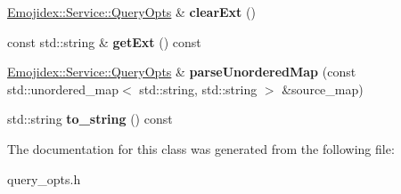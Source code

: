 \begin{DoxyCompactItemize}
\item 
\hyperlink{classEmojidex_1_1Service_1_1QueryOpts}{Emojidex\+::\+Service\+::\+Query\+Opts} \& {\bfseries clear\+Ext} ()\hypertarget{classEmojidex_1_1Service_1_1QueryOpts_ae0455c295169a616efbbd5b3721c998f}{}\label{classEmojidex_1_1Service_1_1QueryOpts_ae0455c295169a616efbbd5b3721c998f}

\item 
const std\+::string \& {\bfseries get\+Ext} () const \hypertarget{classEmojidex_1_1Service_1_1QueryOpts_ae1904d52159992a8bc6b50eefe2f27c6}{}\label{classEmojidex_1_1Service_1_1QueryOpts_ae1904d52159992a8bc6b50eefe2f27c6}

\item 
\hyperlink{classEmojidex_1_1Service_1_1QueryOpts}{Emojidex\+::\+Service\+::\+Query\+Opts} \& {\bfseries parse\+Unordered\+Map} (const std\+::unordered\+\_\+map$<$ std\+::string, std\+::string $>$ \&source\+\_\+map)\hypertarget{classEmojidex_1_1Service_1_1QueryOpts_afeace74ce515ca48c21c01fae5c01838}{}\label{classEmojidex_1_1Service_1_1QueryOpts_afeace74ce515ca48c21c01fae5c01838}

\item 
std\+::string {\bfseries to\+\_\+string} () const \hypertarget{classEmojidex_1_1Service_1_1QueryOpts_a8a513409a7f1c5509bd393bb2bd28225}{}\label{classEmojidex_1_1Service_1_1QueryOpts_a8a513409a7f1c5509bd393bb2bd28225}

\end{DoxyCompactItemize}


The documentation for this class was generated from the following file\+:\begin{DoxyCompactItemize}
\item 
query\+\_\+opts.\+h\end{DoxyCompactItemize}
